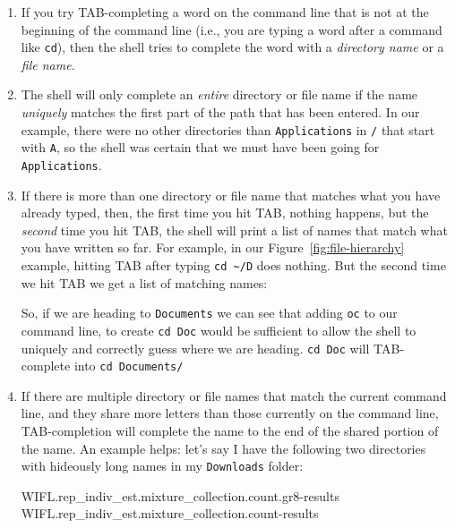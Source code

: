 \documentclass[]{krantz}
\makeatletter
\newenvironment{Shaded}{\begin{snugshade}}{\end{snugshade}}
\newcommand{\ExtensionTok}[1]{#1}
\newcommand{\NormalTok}[1]{#1}
\newenvironment{kframe}{%
\medskip{}
\setlength{\fboxsep}{.8em}
 \def\at@end@of@kframe{}%
 \ifinner\ifhmode%
  \def\at@end@of@kframe{\end{minipage}}%
  \begin{minipage}{\columnwidth}%
 \fi\fi%
 \def\FrameCommand##1{\hskip\@totalleftmargin \hskip-\fboxsep
 \colorbox{shadecolor}{##1}\hskip-\fboxsep
     \hskip-\linewidth \hskip-\@totalleftmargin \hskip\columnwidth}%
 \MakeFramed {\advance\hsize-\width
   \@totalleftmargin\z@ \linewidth\hsize
   \@setminipage}}%
 {\par\unskip\endMakeFramed%
 \at@end@of@kframe}
\renewenvironment{Shaded}{\begin{kframe}}{\end{kframe}}
\makeatother
\begin{document}
\begin{enumerate}
\def\labelenumi{\arabic{enumi}.}
\item
  If you try TAB-completing a word on the command line that is not at the beginning
  of the command line (i.e., you are typing a word after a command like \texttt{cd}), then the shell
  tries to complete the word with a \emph{directory name} or a \emph{file name}.
\item
  The shell will only complete an \emph{entire} directory or file name if the name \emph{uniquely} matches the first part of the
  path that has been entered. In our example, there were no other directories than \texttt{Applications} in \texttt{/} that start
  with \texttt{A}, so the shell was certain that we must have been going for \texttt{Applications}.
\item
  If there is more than one directory or file name that matches what you have already typed, then, the first
  time you hit TAB, nothing happens, but the \emph{second} time you hit TAB, the shell will print a list of
  names that match what you have written so far. For example, in our Figure~\ref{fig:file-hierarchy} example,
  hitting TAB after typing \texttt{cd\ \textasciitilde{}/D} does nothing. But the second time we hit TAB we get a list of
  matching names:

\begin{Shaded}
\end{Shaded}

  So, if we are heading to \texttt{Documents} we can see that adding \texttt{oc} to our command line, to create \texttt{cd\ Doc} would be sufficient to allow the shell to
  uniquely and correctly guess where we are heading. \texttt{cd\ Doc} will TAB-complete into \texttt{cd\ Documents/}
\item
  If there are multiple directory or file names that match the current command line, and they share
  more letters than those currently on the command line, TAB-completion will complete
  the name to the end of the shared portion of the name. An example helps: let's say
  I have the following two directories with hideously long names in my \texttt{Downloads} folder:

\begin{Shaded}
\begin{Highlighting}[]
\ExtensionTok{WIFL.rep_indiv_est.mixture_collection.count.gr8-results}
\ExtensionTok{WIFL.rep_indiv_est.mixture_collection.count-results}
\end{Highlighting}
\end{Shaded}


\end{enumerate}
\end{document}
